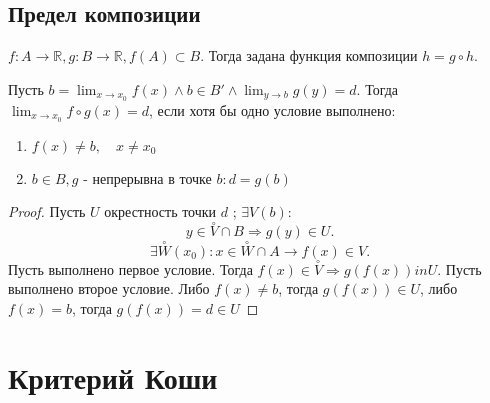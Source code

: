 \documentclass[11pt]{book}
\newcommand{\R}{\mathbb{R}}
\newcommand{\pivi}{\stackrel \circ }
\theoremstyle{definition}
\theoremstyle{plain}
\theoremstyle{plain}
\theoremstyle{definition}
\theoremstyle{remark}
\begin{document}
\subsection{Предел композиции}\label{ques_37}
\begin{defn}
    $f : A \to  \R, g: B \to  \R, f(A) \subset B$. Тогда задана функция композиции $h = g \circ h$.
\end{defn}
\begin{thm}
    Пусть $b = \lim_{x \to x_0} f(x) \wedge b \in  B' \wedge \lim_{y \to  b} g(y) = d $. Тогда $\lim_{x \to  x_0} f \circ g (x)= d$, если хотя бы одно условие выполнено:
    \begin{enumerate}
	\item $f(x) \ne b, \quad x \ne x_0$ 
	\item $b \in  B, g \mbox{ - непрерывна в точке }b: d = g(b)$
    \end{enumerate}
\end{thm}
\begin{proof}
    Пусть $U$ окрестность точки $d$ ; $\exists V(b)$:
    \[
	y \in  \pivi V \cap B \Rightarrow g(y) \in  U
    .\] 
    \[
	\exists \pivi W(x_0): x \in  \pivi W \cap A \to f(x) \in  V
    .\] 
    Пусть выполнено первое условие. Тогда $f(x) \in  \pivi V \Rightarrow  g(f(x)) in U$.
    Пусть выполнено второе условие. Либо $f(x) \ne b$, тогда $g(f(x)) \in  U$, либо $f(x) = b$, тогда $g(f(x)) = d \in  U$
\end{proof}

\section{Критерий Коши}
\end{document}
